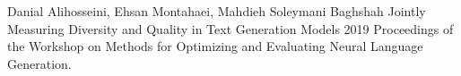 
\begin{cventries}
    \cventry
    {Danial Alihosseini, Ehsan Montahaei, Mahdieh Soleymani Baghshah}
    {Jointly Measuring Diversity and Quality in Text Generation Models}
    {2019}
    {}
    {Proceedings of the Workshop on Methods for Optimizing and Evaluating Neural Language Generation.}
\end{cventries}